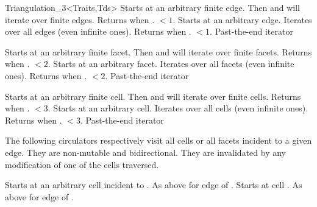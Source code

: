 \begin{ccClassTemplate}{Triangulation_3<Traits,Tds>}
{Starts at an arbitrary finite edge. Then \ccc{++} and \ccc{--} will
iterate over finite edges. Returns  when
\ccVar. $<1$.} 
\ccGlue
{}
{Starts at an arbitrary edge. Iterates over all edges (even infinite
ones). Returns  when \ccVar. $<1$.}
\ccGlue
{}
{Past-the-end iterator}

{Starts at an arbitrary finite facet. Then \ccc{++} and \ccc{--} will
iterate over finite facets. Returns  when
\ccVar. $<2$.}
\ccGlue
{}
{Starts at an arbitrary facet. Iterates over all facets (even infinite
ones). Returns  when 
\ccVar. $<2$.}
\ccGlue
{}
{Past-the-end iterator}

{Starts at an arbitrary finite cell. Then \ccc{++} and \ccc{--} will
iterate over finite cells. Returns  when
\ccVar. $<3$.}
\ccGlue
{}
{Starts at an arbitrary cell. Iterates over all cells (even infinite
ones). Returns  when 
\ccVar. $<3$.}
\ccGlue
{}
{Past-the-end iterator}


The following circulators respectively visit all cells or all facets
incident to a given edge. They are non-mutable and bidirectional. They
are invalidated by any modification of one of the cells traversed. 

{Starts at an arbitrary cell incident to .
}
\ccGlue
{}
{As above for edge  of .}
\ccGlue
{}
{Starts at cell .
}
\ccGlue
{}
{As above for edge  of .}


\end{ccClassTemplate}
